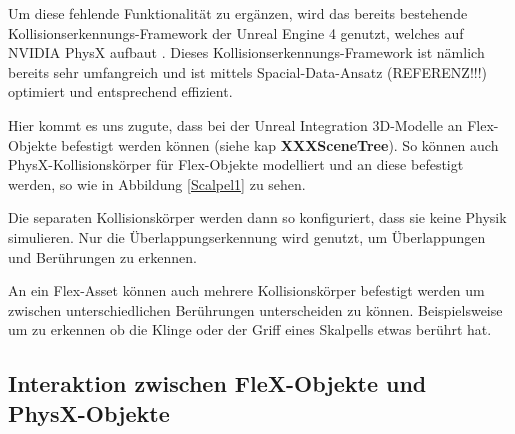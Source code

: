 Um diese fehlende Funktionalität zu ergänzen, wird das bereits bestehende Kollisionserkennungs-Framework der Unreal Engine 4 genutzt, welches auf NVIDIA PhysX aufbaut \cite{ue4physics}. Dieses Kollisionserkennungs-Framework ist nämlich bereits sehr umfangreich und ist mittels Spacial-Data-Ansatz (REFERENZ!!!) optimiert und entsprechend effizient.


Hier kommt es uns zugute, dass bei der Unreal Integration 3D-Modelle an Flex-Objekte befestigt werden können (siehe kap \textbf{XXXSceneTree}). So können auch PhysX-Kollisionskörper für Flex-Objekte modelliert und an diese befestigt werden, so wie in Abbildung \ref{Scalpel1} zu sehen.


Die separaten Kollisionskörper werden dann so konfiguriert, dass sie keine Physik simulieren. Nur die Überlappungserkennung wird genutzt, um Überlappungen und Berührungen zu erkennen.

An ein Flex-Asset können auch mehrere Kollisionskörper befestigt werden um zwischen unterschiedlichen Berührungen unterscheiden zu können. Beispielsweise um zu erkennen ob die Klinge oder der Griff eines Skalpells etwas berührt hat.


  
\subsection{Interaktion zwischen FleX-Objekte und PhysX-Objekte}

 
